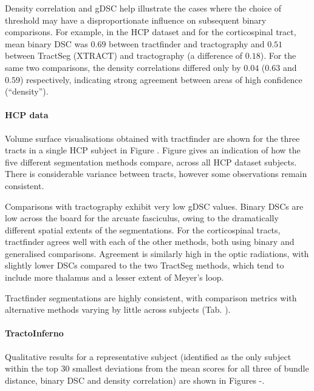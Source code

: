 Density correlation and gDSC help illustrate the cases where the choice of threshold may have a disproportionate influence on subsequent binary comparisons.
For example, in the HCP dataset and for the corticospinal tract, mean binary DSC was $0.69$ between tractfinder and tractography and $0.51$ between TractSeg (XTRACT) and tractography (a difference of $0.18$).
For the same two comparisons, the density correlations differed only by $0.04$ ($0.63$ and $0.59$) respectively, indicating strong agreement between areas of high confidence (``density'').

\paragraph{HCP data}

Volume surface visualisations obtained with tractfinder are shown for the three tracts in a single HCP subject in Figure .
Figure  gives an indication of how the five different segmentation methods compare, across all HCP dataset subjects.
There is considerable variance between tracts, however some observations remain consistent.

Comparisons with tractography exhibit very low gDSC values.
Binary DSCs are low across the board for the arcuate fasciculus, owing to the dramatically different spatial extents of the segmentations.
For the corticospinal tracts, tractfinder agrees well with each of the other methods, both using binary and generalised comparisons.
Agreement is similarly high in the optic radiations, with slightly lower DSCs compared to the two TractSeg methods, which tend to include more thalamus and a lesser extent of Meyer's loop.

Tractfinder segmentations are highly consistent, with comparison metrics with alternative methods varying by little across subjects (Tab. ).

\paragraph{TractoInferno}

Qualitative results for a representative subject (identified as the only subject within the top 30 smallest deviations from the mean scores for all three of bundle distance, binary DSC and density correlation) are shown in Figures -.

